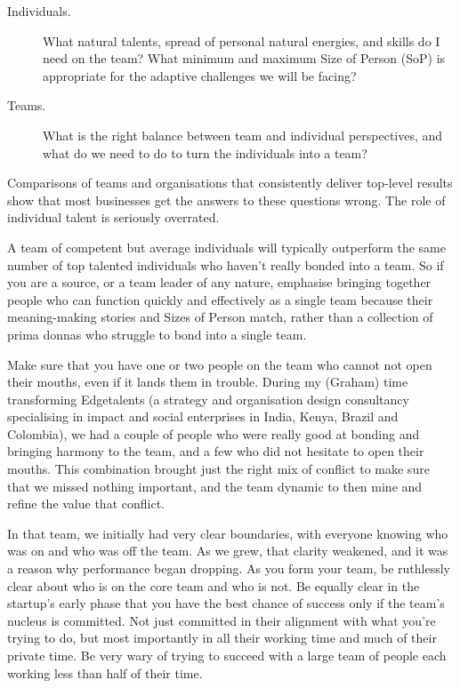 \begin{description}
\item[Individuals.] What natural talents, spread of personal natural energies, and skills do I need on the team? What minimum and maximum Size of Person (SoP) is appropriate for the adaptive challenges we will be facing?
\item[Teams.] What is the right balance between team and individual perspectives, and what do we need to do to turn the individuals into a team?
\end{description}


Comparisons of teams and organisations that consistently deliver top-level results show that most businesses get the answers to these questions wrong. The role of individual talent is seriously overrated.


A team of competent but average individuals will typically outperform the same number of top talented individuals who haven’t really bonded into a team. So if you are a source, or a team leader of any nature, emphasise bringing together people who can function quickly and effectively as a single team because their meaning\hyp{}making stories and Sizes of Person match, rather than a collection of prima donnas who struggle to bond into a single team.


Make sure that you have one or two people on the team who cannot not open their mouths, even if it lands them in trouble. During my (Graham) time transforming Edgetalents (a strategy and organisation design consultancy specialising in impact and social enterprises in India, Kenya, Brazil and Colombia),  we had a couple of people who were really good at bonding and bringing harmony to the team, and a few who did not hesitate to open their mouths. This combination brought just the right mix of conflict to make sure that we missed nothing important, and the team dynamic to then mine and refine the value that conflict. 


In that team, we initially had very clear boundaries, with everyone knowing who was on and who was off the team. As we grew, that clarity weakened, and it was a reason why performance began dropping. As you form your team, be ruthlessly clear about who is on the core team and who is not. Be equally clear in the startup’s early phase that you have the best chance of success only if the team’s nucleus is committed. Not just committed in their alignment with what you're trying to do, but most importantly in all their working time and much of their private time. Be very wary of trying to succeed with a large team of people each working less than half of their time.


